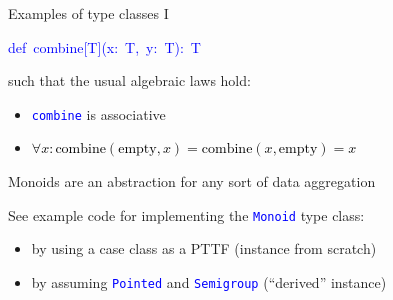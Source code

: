 \documentclass[english]{beamer}
\newenvironment{lyxcode}
   {\par\begin{list}{}{
     \setlength{\rightmargin}{\leftmargin}
     \setlength{\listparindent}{0pt}%
     \raggedright
     \setlength{\itemsep}{0pt}
     \setlength{\parsep}{0pt}
     \normalfont\ttfamily}%
    \def\{{\char`\{}
    \def\}{\char`\}}
    \def\textasciitilde{\char`\~}
    \item[]}
   {\end{list}}
\begin{document}
\begin{frame}{Examples of type classes I}
\begin{itemize}
\begin{lyxcode}
\textcolor{blue}{\footnotesize{}def~combine{[}T{]}(x:~T,~y:~T):~T}{\footnotesize \par}
\end{lyxcode}
such that the usual algebraic laws hold:
\begin{itemize}
\item \texttt{\textcolor{blue}{\footnotesize{}combine}} is associative
\item \texttt{\textcolor{black}{\footnotesize{}$\forall x:\text{combine}(\text{empty},x)=\text{combine}(x,\text{empty})=x$ }}{\footnotesize \par}
\end{itemize}
\item Monoids are an abstraction for any sort of data aggregation
\end{itemize}
See example code for implementing the \texttt{\textcolor{blue}{\footnotesize{}Monoid}}
type class:
\begin{itemize}
\item by using a case class as a PTTF (instance from scratch)
\item by assuming \texttt{\textcolor{blue}{\footnotesize{}Pointed}} and
\texttt{\textcolor{blue}{\footnotesize{}Semigroup}} (``derived''
instance)
\end{itemize}
\end{frame}
\end{document}
